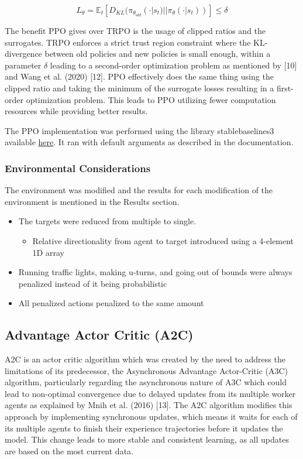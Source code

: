 \documentclass{article}
\begin{document}
	\begin{equation}
		L_{\theta} = \mathbb{E}_{t}[D_{KL}(\pi_{\theta_{old}}(\cdot|s_{t}) || \pi_{\theta}(\cdot|s_{t}))] \leq \delta
	\end{equation}
	
	The benefit PPO gives over TRPO is the usage of clipped ratios and the surrogates. TRPO enforces a strict trust region constraint where the KL-divergence between old policies and new policies is small enough, within a parameter $\delta$ leading to a second-order optimization problem as mentioned by [10] and Wang et al. (2020) [12]. PPO effectively does the same thing using the clipped ratio and taking the minimum of the surrogate losses resulting in a first-order optimization problem. This leads to PPO utilizing fewer computation resources while providing better results.
	
	The PPO implementation was performed using the library stable\textunderscore baselines3 available  \href{https://stable-baselines3.readthedocs.io/en/master/}{here}. It ran with default arguments as described in the documentation.
	
	\subsubsection{Environmental Considerations}
	\label{considerations}
	The environment was modified and the results for each modification of the environment is mentioned in the Results section.
	\begin{itemize}
		\item The targets were reduced from multiple to single. 
		\begin{itemize}
			\item Relative directionality from agent to target introduced using a 4-element 1D array
		\end{itemize}
		\item Running traffic lights, making u-turns, and going out of bounds were always penalized instead of it being probabilistic
		\item All penalized actions penalized to the same amount
	\end{itemize}
	
	\subsection{Advantage Actor Critic (A2C)}
	\label{a2c}
	A2C is an actor critic algorithm which was created by the need to address the limitations of its predecessor, the Asynchronous Advantage Actor-Critic (A3C) algorithm, particularly regarding the asynchronous nature of A3C which could lead to non-optimal convergence due to delayed updates from its multiple worker agents as explained by Mnih et al. (2016) [13]. The A2C algorithm modifies this approach by implementing synchronous updates, which means it waits for each of its multiple agents to finish their experience trajectories before it updates the model. This change leads to more stable and consistent learning, as all updates are based on the most current data.
	
\end{document}
